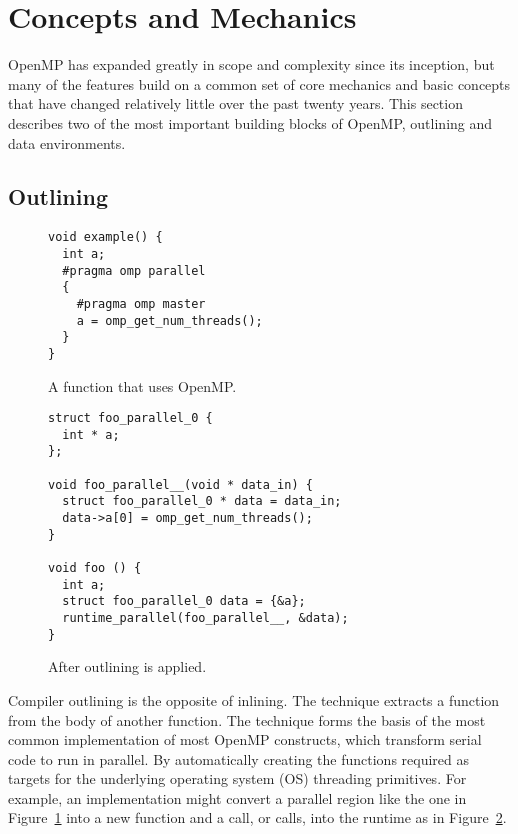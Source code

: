 \section{Concepts and Mechanics}
\label{sec:concepts}

OpenMP has expanded greatly in scope and complexity since its inception, but
many of the features build on a common set of core mechanics and basic concepts
that have changed relatively little over the past twenty years.  This section
describes two of the most important building blocks of OpenMP, outlining and
data environments.

\subsection{Outlining}
\label{sub:outlining}

\begin{figure}
\begin{verbatim}
void example() {
  int a;
  #pragma omp parallel
  {
    #pragma omp master
    a = omp_get_num_threads();
  }
}
\end{verbatim}
\caption{A function that uses OpenMP.\label{fig:outline-before}}
\end{figure}

\begin{figure}
\begin{verbatim}
struct foo_parallel_0 {
  int * a;
};

void foo_parallel__(void * data_in) {
  struct foo_parallel_0 * data = data_in;
  data->a[0] = omp_get_num_threads();
}

void foo () {
  int a;
  struct foo_parallel_0 data = {&a};
  runtime_parallel(foo_parallel__, &data);
}
\end{verbatim}
\caption{After outlining is applied.\label{fig:outline-after}}
\end{figure}

Compiler outlining is the opposite of inlining. The technique extracts a 
function from the body of another function. The technique forms the basis 
of the most common implementation of most OpenMP constructs, which transform
serial code to run in parallel. By automatically creating the 
functions required as targets for the underlying operating system (OS) 
threading primitives. For example, an implementation might convert a 
parallel region like the one in Figure~\ref{fig:outline-before} into a 
new function and a call, or calls, into the runtime as in 
Figure~\ref{fig:outline-after}.


